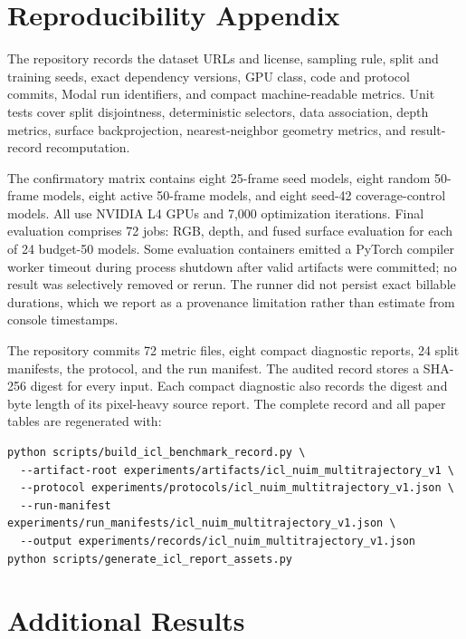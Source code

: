 \section{Reproducibility Appendix}

The repository records the dataset URLs and license, sampling rule, split and
training seeds, exact dependency versions, GPU class, code and protocol commits,
Modal run identifiers, and compact machine-readable metrics.  Unit tests cover
split disjointness, deterministic selectors, data association, depth metrics,
surface backprojection, nearest-neighbor geometry metrics, and result-record
recomputation.

The confirmatory matrix contains eight 25-frame seed models, eight random
50-frame models, eight active 50-frame models, and eight seed-42 coverage-control
models.  All use NVIDIA L4 GPUs and 7,000 optimization iterations.  Final
evaluation comprises 72 jobs: RGB, depth, and fused surface evaluation for each
of 24 budget-50 models.  Some evaluation containers emitted a PyTorch compiler
worker timeout during process shutdown after valid artifacts were committed;
no result was selectively removed or rerun.  The runner did not persist exact
billable durations, which we report as a provenance limitation rather than
estimate from console timestamps.

The repository commits 72 metric files, eight compact diagnostic reports, 24
split manifests, the protocol, and the run manifest.  The audited record stores
a SHA-256 digest for every input.  Each compact diagnostic also records the
digest and byte length of its pixel-heavy source report.  The complete record
and all paper tables are regenerated with:

\begin{verbatim}
python scripts/build_icl_benchmark_record.py \
  --artifact-root experiments/artifacts/icl_nuim_multitrajectory_v1 \
  --protocol experiments/protocols/icl_nuim_multitrajectory_v1.json \
  --run-manifest experiments/run_manifests/icl_nuim_multitrajectory_v1.json \
  --output experiments/records/icl_nuim_multitrajectory_v1.json
python scripts/generate_icl_report_assets.py
\end{verbatim}

\section{Additional Results}
\begin{table}[h]
  \centering
  \caption{All eight active-minus-random paired co-primary and RGB/depth
  effects.  Directions follow the main table.}
  
\end{table}

